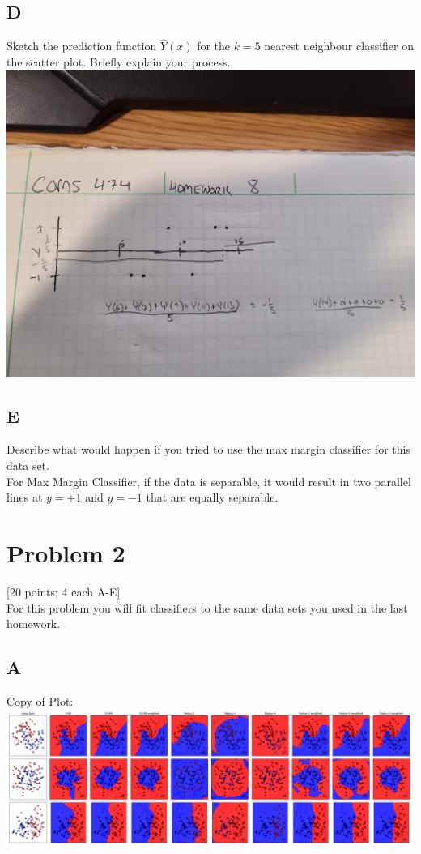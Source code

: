 \documentclass[12pt]{article}
\begin{document}
\subsection{D}
Sketch the prediction function $\hat{Y}(x)$ for the $k = 5$ nearest neighbour classifier on the scatter plot. Briefly explain your process.\\
\includegraphics[width=1\textwidth]{p1.d.jpg}

\subsection{E}
Describe what would happen if you tried to use the max margin classifier for this data set.\\
For Max Margin Classifier, if the data is separable, it would result in two parallel lines at $y = +1$ and $y = -1$ that are equally separable.

\pagebreak
\section{Problem 2}
 [20 points; 4 each A-E]\\
For this problem you will fit classifiers to the same data sets you used in the last homework.
\subsection{A}
Copy of Plot:\\
\includegraphics[width=1\textwidth]{p2.a.png}
\end{document}
